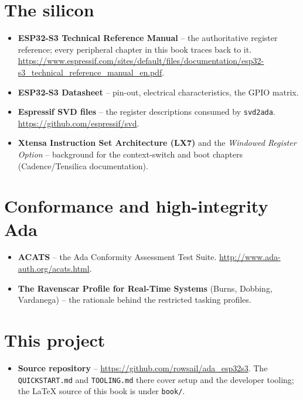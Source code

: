 \section{The silicon}

\begin{itemize}
\item \textbf{ESP32-S3 Technical Reference Manual} -- the authoritative register
  reference; every peripheral chapter in this book traces back to it.
  \url{https://www.espressif.com/sites/default/files/documentation/esp32-s3_technical_reference_manual_en.pdf}.
\item \textbf{ESP32-S3 Datasheet} -- pin-out, electrical characteristics, the
  GPIO matrix.
\item \textbf{Espressif SVD files} -- the register descriptions consumed by
  \texttt{svd2ada}. \url{https://github.com/espressif/svd}.
\item \textbf{Xtensa Instruction Set Architecture (LX7)} and the
  \emph{Windowed Register Option} -- background for the context-switch and boot
  chapters (Cadence/Tensilica documentation).
\end{itemize}

\section{Conformance and high-integrity Ada}

\begin{itemize}
\item \textbf{ACATS} -- the Ada Conformity Assessment Test Suite.
  \url{http://www.ada-auth.org/acats.html}.
\item \textbf{The Ravenscar Profile for Real-Time Systems} (Burns, Dobbing,
  Vardanega) -- the rationale behind the restricted tasking profiles.
\end{itemize}

\section{This project}

\begin{itemize}
\item \textbf{Source repository} --
  \url{https://github.com/rowsail/ada_esp32s3}. The
  \texttt{QUICKSTART.md} and \texttt{TOOLING.md} there cover setup and the
  developer tooling; the \LaTeX{} source of this book is under \texttt{book/}.
\end{itemize}
